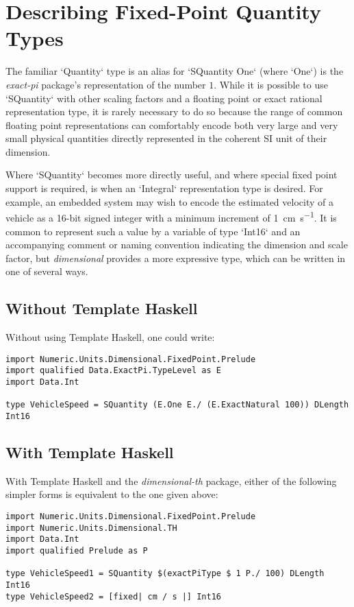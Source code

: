 \documentclass[11pt]{report}
\newcommand{\packagename}[1]{\textit{#1}}
\newcommand{\thispackage}{\packagename{dimensional}}
\begin{document}
\section{Describing Fixed-Point Quantity Types}

The familiar `Quantity` type is an alias for `SQuantity One` (where `One`) is the \packagename{exact-pi}
package's representation of the number $ 1 $. While it is possible to use `SQuantity` with other scaling factors and a
floating point or exact rational representation type, it is rarely necessary to do so because the range of common floating
point representations can comfortably encode both very large and very small physical quantities directly represented in the
coherent SI unit of their dimension.

Where `SQuantity` becomes more directly useful, and where special fixed point support is required, is when an
`Integral` representation type is desired. For example, an embedded system may wish to encode the estimated
velocity of a vehicle as a 16-bit signed integer with a minimum increment of \SI{1}{\centi\meter\per\second}. It is common
to represent such a value by a variable of type `Int16` and an accompanying comment or naming convention indicating
the dimension and scale factor, but \thispackage{} provides a more expressive type, which can be written in one of several ways.

\subsection{Without Template Haskell}

Without using Template Haskell, one could write:

\begin{lstlisting}
import Numeric.Units.Dimensional.FixedPoint.Prelude
import qualified Data.ExactPi.TypeLevel as E
import Data.Int

type VehicleSpeed = SQuantity (E.One E./ (E.ExactNatural 100)) DLength Int16
\end{lstlisting}

\subsection{With Template Haskell} \label{fixed-point-th}

With Template Haskell and the \packagename{dimensional-th} package, either of the following simpler forms is equivalent to the one given above:

\begin{lstlisting}
import Numeric.Units.Dimensional.FixedPoint.Prelude
import Numeric.Units.Dimensional.TH
import Data.Int
import qualified Prelude as P

type VehicleSpeed1 = SQuantity $(exactPiType $ 1 P./ 100) DLength Int16
type VehicleSpeed2 = [fixed| cm / s |] Int16
\end{lstlisting}
\end{document}

